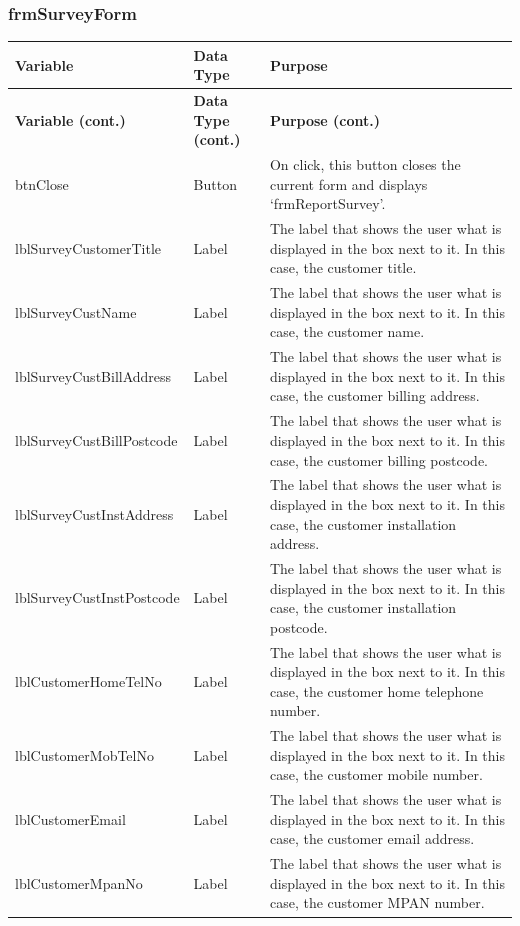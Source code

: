 	\subsubsection{frmSurveyForm}
	\begin{longtable}{ | p{4cm} | p{3cm} | p{10cm} |}
		\hline
		\textbf{Variable} & \textbf{Data Type} & \textbf{Purpose}\\
		\endfirsthead
		\hline
		\textbf{Variable (cont.)} & \textbf{Data Type (cont.)} & \textbf{Purpose (cont.)}\\
		\endhead
		\hline
		btnClose & Button & On click, this button closes the current form and displays `frmReportSurvey'.\\
		\hline
		lblSurveyCustomerTitle & Label & The label that shows the user what is displayed in the box next to it.  In this case, the customer title.\\
		\hline
		lblSurveyCustName & Label & The label that shows the user what is displayed in the box next to it.  In this case, the customer name.\\
		\hline
		lblSurveyCustBillAddress & Label & The label that shows the user what is displayed in the box next to it.  In this case, the customer billing address.\\
		\hline
		lblSurveyCustBillPostcode & Label & The label that shows the user what is displayed in the box next to it.  In this case, the customer billing postcode.\\
		\hline
		lblSurveyCustInstAddress & Label & The label that shows the user what is displayed in the box next to it.  In this case, the customer installation address.\\
		\hline
		lblSurveyCustInstPostcode & Label & The label that shows the user what is displayed in the box next to it.  In this case, the customer installation postcode.\\
		\hline
		lblCustomerHomeTelNo & Label & The label that shows the user what is displayed in the box next to it.  In this case, the customer home telephone number.\\
		\hline
		lblCustomerMobTelNo & Label & The label that shows the user what is displayed in the box next to it.  In this case, the customer mobile number.\\
		\hline
		lblCustomerEmail & Label & The label that shows the user what is displayed in the box next to it.  In this case, the customer email address.\\
		\hline
		lblCustomerMpanNo & Label & The label that shows the user what is displayed in the box next to it.  In this case, the customer MPAN number.\\

\end{longtable}
